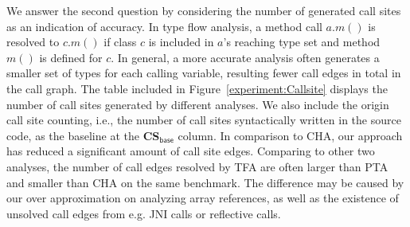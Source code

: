 \documentclass{llncs}
\begin{document}
We answer the second question by considering the number of generated call sites as an indication of accuracy. In type flow analysis, a method call $a.m()$ is resolved to $c.m()$ if class $c$ is included in $a$'s reaching type set and method $m()$ is defined for $c$. In general, a more accurate analysis often generates a smaller set of types for each calling variable, resulting fewer call edges in total in the call graph. The table included in Figure~\ref{experiment:Callsite} displays the number of call sites generated by different analyses. We also include the origin call site counting, i.e., the number of call sites syntactically written in the source code, as the baseline at the \textbf{CS$_{\textsf{base}}$} column. In comparison to CHA, our approach has reduced a significant amount of call site edges.
Comparing to other two analyses, the number of call edges resolved by TFA are often larger than PTA and smaller than CHA on the same benchmark. The difference may be caused by our over approximation on analyzing array references, as well as the existence of unsolved call edges from e.g. JNI calls or reflective calls.

\end{document}
